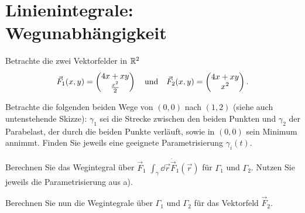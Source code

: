 \documentclass{scrartcl}
\begin{document}
\section{Linienintegrale: Wegunabhängigkeit}
\label{sec:linienintegrale_wegunabh_ngigkeit}

Betrachte die zwei Vektorfelder in $\mathbb{R}^2$
\[
  \vec F_1(x, y) = \begin{pmatrix}4x + xy \\ \frac{x^2}{2}\end{pmatrix} \quad \mbox{und} \quad \vec F_2 (x, y) = \begin{pmatrix}4x + xy \\ x^2\end{pmatrix}.
\]
\begin{subex}
  \item Betrachte die folgenden beiden Wege von $(0,0)$ nach $(1,2)$ (siehe auch untenstehende Skizze):
  $\gamma_1$ sei die Strecke zwischen den beiden Punkten und $\gamma_2$ der Parabelast, der durch die beiden Punkte verläuft, sowie in $(0,0)$ sein Minimum annimmt.
  Finden Sie jeweils eine geeignete Parametrisierung $\gamma_i(t)$.
  \item Berechnen Sie das Wegintegral über $\vec F_1$ $\int_\gamma \dd \vec r \dot \vec F_1(\vec r)$ für $\Gamma_1$ und $\Gamma_2$.
  Nutzen Sie jeweils die Parametrisierung aus a).
  \item Berechnen Sie nun die Wegintegrale über $\Gamma_1$ und $\Gamma_2$ für das Vektorfeld $\vec F_2$.
\end{subex}

\begin{center}
\end{center}
\end{document}
